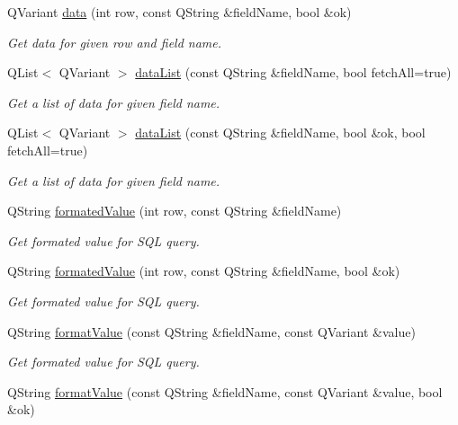 \begin{DoxyCompactItemize}
Q\-Variant \hyperlink{classmdt_abstract_sql_table_controller_a99a52795749a325b8b96096cffe60866}{data} (int row, const Q\-String \&field\-Name, bool \&ok)
\begin{DoxyCompactList}\small\item\em Get data for given row and field name. \end{DoxyCompactList}\item 
Q\-List$<$ Q\-Variant $>$ \hyperlink{classmdt_abstract_sql_table_controller_a46896c6920f306f2c2ad03281ec64c74}{data\-List} (const Q\-String \&field\-Name, bool fetch\-All=true)
\begin{DoxyCompactList}\small\item\em Get a list of data for given field name. \end{DoxyCompactList}\item 
Q\-List$<$ Q\-Variant $>$ \hyperlink{classmdt_abstract_sql_table_controller_a712e896a677fc0f6660305c35947ef9f}{data\-List} (const Q\-String \&field\-Name, bool \&ok, bool fetch\-All=true)
\begin{DoxyCompactList}\small\item\em Get a list of data for given field name. \end{DoxyCompactList}\item 
Q\-String \hyperlink{classmdt_abstract_sql_table_controller_ae904bcb5f6656e6f88a3c3c73191e337}{formated\-Value} (int row, const Q\-String \&field\-Name)
\begin{DoxyCompactList}\small\item\em Get formated value for S\-Q\-L query. \end{DoxyCompactList}\item 
Q\-String \hyperlink{classmdt_abstract_sql_table_controller_a359d809042ec35007a58dacb6a1172ea}{formated\-Value} (int row, const Q\-String \&field\-Name, bool \&ok)
\begin{DoxyCompactList}\small\item\em Get formated value for S\-Q\-L query. \end{DoxyCompactList}\item 
Q\-String \hyperlink{classmdt_abstract_sql_table_controller_a17b43facd84cd020c498ac3367b49595}{format\-Value} (const Q\-String \&field\-Name, const Q\-Variant \&value)
\begin{DoxyCompactList}\small\item\em Get formated value for S\-Q\-L query. \end{DoxyCompactList}\item 
Q\-String \hyperlink{classmdt_abstract_sql_table_controller_a1cd1d86cde47b62ca4a272f4334adf9d}{format\-Value} (const Q\-String \&field\-Name, const Q\-Variant \&value, bool \&ok)

\end{DoxyCompactItemize}
